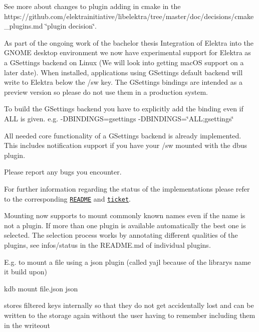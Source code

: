 See more about changes to plugin adding in cmake in the https\+://github.com/elektrainitiative/libelektra/tree/master/doc/decisions/cmake\+\_\+plugins.\+md \char`\"{}plugin decision\char`\"{}.

As part of the ongoing work of the bachelor thesis {\ttfamily Integration of Elektra into the G\+N\+O\+ME desktop environment} we now have experimental support for Elektra as a G\+Settings backend on Linux (We will look into getting mac\+OS support on a later date). When installed, applications using G\+Settings default backend will write to Elektra below the {\ttfamily /sw} key. The G\+Settings bindings are intended as a preview version so please do not use them in a production system.

To build the G\+Settings backend you have to explicitly add the binding even if {\ttfamily A\+LL} is given. e.\+g. {\ttfamily -\/\+D\+B\+I\+N\+D\+I\+N\+GS=gsettings} {\ttfamily -\/\+D\+B\+I\+N\+D\+I\+N\+GS=\char`\"{}\+A\+L\+L;gsettings\char`\"{}}

All needed core functionality of a G\+Settings backend is already implemented. This includes notification support if you have your {\ttfamily /sw} mounted with the dbus plugin.

Please report any bugs you encounter.

For further information regarding the status of the implementations please refer to the corresponding \href{https://github.com/elektrainitiative/libelektra/tree/master/src/bindings/gsettings}{\tt R\+E\+A\+D\+ME} and \href{https://github.com/ElektraInitiative/libelektra/issues/775}{\tt ticket}.

Mounting now supports to mount commonly known names even if the name is not a plugin. If more than one plugin is available automatically the best one is selected. The selection process works by annotating different qualities of the plugins, see {\ttfamily infos/status} in the R\+E\+A\+D\+M\+E.\+md of individual plugins.

E.\+g. to mount a file using a json plugin (called yajl because of the library\textquotesingle{}s name it build upon)


\begin{DoxyCode}
kdb mount file.json json
\end{DoxyCode}


stores filtered keys internally so that they do not get accidentally lost and can be written to the storage again without the user having to remember including them in the writeout

